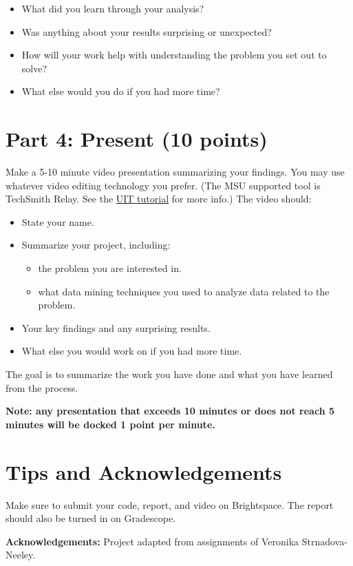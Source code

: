 \documentclass[11pt]{article}
\begin{document}
\begin{itemize}
\begin{itemize}
    \end{itemize}

    \item What did you learn through your analysis?

    \item Was anything about your results surprising or unexpected?

    \item How will your work help with understanding the problem you set out to
    solve?

    \item What else would you do if you had more time?
\end{itemize}

\section*{Part 4: Present (10 points)}

Make a 5-10 minute video presentation summarizing your findings. You may use
whatever video editing technology you prefer. (The MSU supported tool is
TechSmith Relay.  See the
\href{https://ato.montana.edu/accessforall/tutorials/techsmith/5-steps-to-record-techsmith-video.html}{UIT
tutorial} for more info.) The video should:

\begin{itemize}

    \item State your name.

    \item Summarize your project, including:
    \begin{itemize}

        \item the problem you are interested in.

        \item what data mining techniques you used to analyze data related to
        the problem.

    \end{itemize}

    \item Your key findings and any surprising results.

    \item What else you would work on if you had more time.

\end{itemize}

The goal is to summarize the work you have done and what you have learned from
the process.
\linebreak

\noindent
{\bf Note: any presentation that exceeds 10 minutes or does not reach 5
minutes will be docked 1 point per minute.}

\section*{Tips and Acknowledgements}

Make sure to submit your code, report, and video on Brightspace. The report
should also be turned in on Gradescope.

{\bf Acknowledgements:} Project adapted from assignments of Veronika
Strnadova-Neeley.
\end{document}
